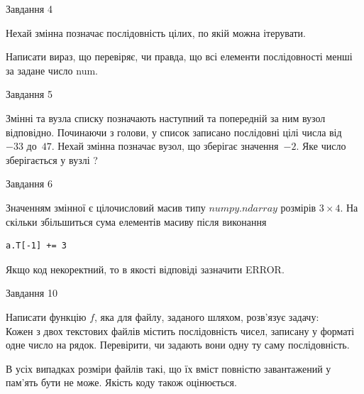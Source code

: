 \documentclass[12pt, ukrainian]{article}
\begin{document}
{               
{\begin{center}Завдання {4}\end{center}}
\vspace{-6mm}
Нехай змінна  позначає послідовність цілих, по якій можна ітерувати.

Написати вираз, що перевіряє, чи правда, що всі елементи послідовності менші за задане число num.\par

\vspace{10mm}
               
{\begin{center}Завдання {5}\end{center}}
\vspace{-6mm}
Змінні  та  вузла списку позначають наступний та попередній за ним вузол відповідно. Починаючи з голови, у список записано послідовні цілі числа від~$-33$ до~$47$. Нехай змінна  позначає вузол, що зберігає значення~$-2$.
Яке число зберігається у вузлі  ?\par

               
{\begin{center}Завдання {6}\end{center}}
\vspace{-6mm}
Значенням змінної  є цілочисловий масив типу $numpy.ndarray$ розмірів $3{\times}4$. На скільки збільшиться сума елементів масиву  після виконання
\begin{verbatim}
a.T[-1] += 3
\end{verbatim}


Якщо код некоректний, то в якості відповіді зазначити ERROR.\par

               
{\begin{center}Завдання {10}\end{center}}
\vspace{-6mm}

Написати функцію $f$, яка для файлу, заданого шляхом, розв’язує задачу:\\ Кожен з двох текстових файлів містить послідовність чисел, записану у форматі одне число на рядок.  Перевірити, чи задають вони одну ту саму послідовність.

В усіх випадках розміри файлів такі, що їх вміст повністю завантажений у пам'ять бути не може. Якість коду також оцінюється.



\vspace{10mm}\par

}
\end{document}
